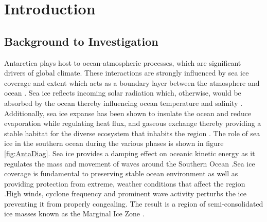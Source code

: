 \chapter{Introduction}
\label{ch:ch1}
\section{Background to Investigation}
\label{sec:ch1.section1}

Antarctica plays host to ocean-atmospheric processes, which are significant drivers of global climate. These interactions are strongly influenced by sea ice coverage and extent which acts as a boundary layer between the atmosphere and ocean \cite{parkinson2004southern}. Sea ice reflects incoming solar radiation which, otherwise, would be absorbed by the ocean thereby influencing ocean temperature and salinity \cite{parkinson2004southern}. Additionally, sea ice expanse  has been shown to insulate the ocean and reduce evaporation while regulating heat flux, and gaseous exchange \cite{deconto2003rapid} thereby providing a stable habitat for the diverse ecosystem that inhabits the region \cite{arrigo2004large}. The role of sea ice in the southern ocean during the various phases is shown in figure \ref{fig:AntaDiag}. Sea ice provides a damping effect on oceanic kinetic energy as it regulates the mass and movement of waves around the Southern Ocean \cite{parkinson2004southern} \cite{roach2020antarctic}.Sea ice coverage is fundamental to preserving stable ocean environment as well as providing protection from extreme, weather conditions that affect the region \cite{vichi2019effects}.High winds, cyclone frequency and prominent wave activity perturbs the ice preventing it from properly congealing. The result is a region of semi-consolidated ice masses known as the Marginal Ice Zone \cite{vichi2019effects}.

